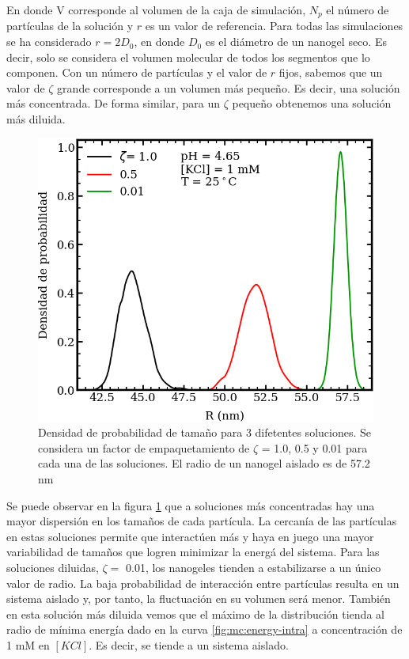 	En donde V corresponde al volumen de la caja de simulación, $N_p$ el n\'umero de part\'iculas de la soluci\'on y $r$ es un valor de referencia.
	Para todas las simulaciones se ha considerado $r= 2D_0$, en donde $D_0$ es el di\'ametro de un nanogel seco. Es decir, solo se considera el volumen molecular de todos los segmentos que lo componen.
	Con un n\'umero de part\'iculas y el valor de $r$ fijos, sabemos que un valor de $\zeta$ grande corresponde a un volumen m\'as peque\~no. Es decir, una soluci\'on m\'as concentrada.
	De forma similar, para un $\zeta$ peque\~no obtenemos una soluci\'on m\'as diluida.
	
	\begin{figure}
		\centering
		\includegraphics[width=0.45\linewidth]{Figures/graph-mc/size-zetas.png}
		\caption{Densidad de probabilidad de tama\~no para 3 difetentes soluciones. Se considera un factor de empaquetamiento de $\zeta$ = 1.0, 0.5 y 0.01 para cada una de las soluciones. El radio de un nanogel aislado es de 57.2 nm}
		\label{fig:mc:densidad-probabilidad}
	\end{figure}
	
	Se puede observar en la figura \ref{fig:mc:densidad-probabilidad} que a soluciones m\'as concentradas hay una mayor dispersi\'on en los tama\~nos de cada part\'icula. La cercan\'ia de las part\'iculas en estas soluciones permite que interact\'uen m\'as y haya en juego una mayor variabilidad de tama\~nos que logren minimizar la energ\'a del sistema.
	Para las soluciones diluidas, $\zeta =$ 0.01, los nanogeles tienden a estabilizarse a un \'unico valor de radio. La baja probabilidad de interacción entre part\'iculas resulta en un sistema aislado y, por tanto, la fluctuaci\'on en su volumen ser\'a menor.
	Tambi\'en en esta soluci\'on m\'as diluida vemos que el m\'aximo de la distribuci\'on tienda al radio de m\'inima energ\'ia dado en la curva \ref{fig:mc:energy-intra} a concentración de 1 mM en  $[KCl]$. Es decir, se tiende a un sistema aislado.
	
